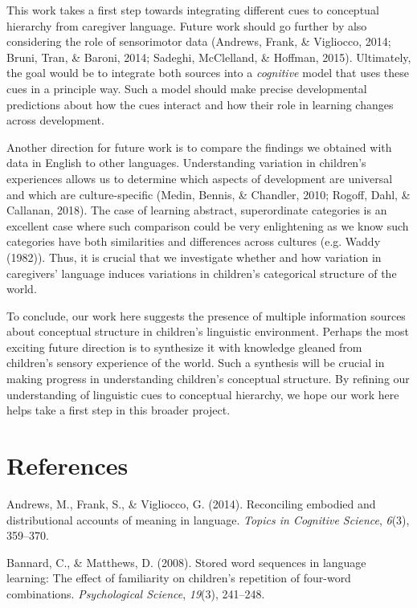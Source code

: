 \documentclass[english,,man,floatsintext]{apa6}
\begin{document}
This work takes a first step towards integrating different cues to conceptual hierarchy from caregiver language. Future work should go further by also considering the role of sensorimotor data (Andrews, Frank, \& Vigliocco, 2014; Bruni, Tran, \& Baroni, 2014; Sadeghi, McClelland, \& Hoffman, 2015). Ultimately, the goal would be to integrate both sources into a \emph{cognitive} model that uses these cues in a principle way. Such a model should make precise developmental predictions about how the cues interact and how their role in learning changes across development.

Another direction for future work is to compare the findings we obtained with data in English to other languages. Understanding variation in children's experiences allows us to determine which aspects of development are universal and which are culture-specific (Medin, Bennis, \& Chandler, 2010; Rogoff, Dahl, \& Callanan, 2018). The case of learning abstract, superordinate categories is an excellent case where such comparison could be very enlightening as we know such categories have both similarities and differences across cultures (e.g. Waddy (1982)). Thus, it is crucial that we investigate whether and how variation in caregivers' language induces variations in children's categorical structure of the world.

To conclude, our work here suggests the presence of multiple information sources about conceptual structure in children's linguistic environment. Perhaps the most exciting future direction is to synthesize it with knowledge gleaned from children's sensory experience of the world. Such a synthesis will be crucial in making progress in understanding children's conceptual structure. By refining our understanding of linguistic cues to conceptual hierarchy, we hope our work here helps take a first step in this broader project.

\hypertarget{references}{%
\section{References}\label{references}}

\setlength{\parindent}{-0.5in}
\setlength{\leftskip}{0.5in}

\hypertarget{refs}{}
\leavevmode\hypertarget{ref-andrews2014}{}%
Andrews, M., Frank, S., \& Vigliocco, G. (2014). Reconciling embodied and distributional accounts of meaning in language. \emph{Topics in Cognitive Science}, \emph{6}(3), 359--370.

\leavevmode\hypertarget{ref-bannard2008}{}%
Bannard, C., \& Matthews, D. (2008). Stored word sequences in language learning: The effect of familiarity on children's repetition of four-word combinations. \emph{Psychological Science}, \emph{19}(3), 241--248.
\end{document}
